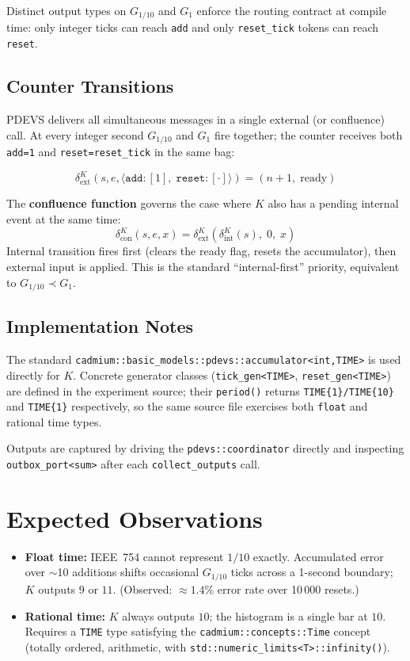 \documentclass[11pt,a4paper]{article}
\begin{document}
Distinct output types on $G_{1/10}$ and $G_1$ enforce the routing contract
at compile time: only integer ticks can reach \texttt{add} and only
\texttt{reset\_tick} tokens can reach \texttt{reset}.

\subsection*{Counter Transitions}

PDEVS delivers all simultaneous messages in a single external (or confluence)
call.  At every integer second $G_{1/10}$ and $G_1$ fire together; the counter
receives both \texttt{add=1} and \texttt{reset=reset\_tick} in the same bag:

\[
  \delta^K_{\text{ext}}(s, e, \langle \texttt{add}:[1],\; \texttt{reset}:[\cdot] \rangle)
  = (n + 1,\; \text{ready})
\]

The \textbf{confluence function} governs the case where $K$ also has a pending
internal event at the same time:
\[
  \delta^K_{\text{con}}(s, e, x) =
    \delta^K_{\text{ext}}\!\left(\delta^K_{\text{int}}(s),\; 0,\; x\right)
\]
Internal transition fires first (clears the ready flag, resets the accumulator),
then external input is applied.  This is the standard ``internal-first''
priority, equivalent to $G_{1/10} \prec G_1$.

\subsection*{Implementation Notes}

The standard \texttt{cadmium::basic\_models::pdevs::accumulator<int,TIME>} is
used directly for $K$.  Concrete generator classes (\texttt{tick\_gen<TIME>},
\texttt{reset\_gen<TIME>}) are defined in the experiment source; their
\texttt{period()} returns \texttt{TIME\{1\}/TIME\{10\}} and \texttt{TIME\{1\}}
respectively, so the same source file exercises both \texttt{float} and rational
time types.

Outputs are captured by driving the \texttt{pdevs::coordinator} directly and
inspecting \texttt{outbox\_port<sum>} after each \texttt{collect\_outputs} call.

\section*{Expected Observations}

\begin{itemize}
  \item \textbf{Float time:} IEEE~754 cannot represent $1/10$ exactly.
        Accumulated error over $\sim$10 additions shifts occasional $G_{1/10}$
        ticks across a 1-second boundary; $K$ outputs $9$ or $11$.
        (Observed: ${\approx}1.4\%$ error rate over 10\,000 resets.)
  \item \textbf{Rational time:} $K$ always outputs $10$; the histogram is a
        single bar at $10$.  Requires a \texttt{TIME} type satisfying the
        \texttt{cadmium::concepts::Time} concept (totally ordered, arithmetic,
        with \texttt{std::numeric\_limits<T>::infinity()}).
\end{itemize}
\end{document}
